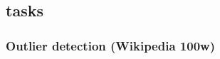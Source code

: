 %
%
%
%
\subsection{\texorpdfstring{}{OT(NM)} tasks}

\subsubsection{Outlier detection (Wikipedia 100w)}

